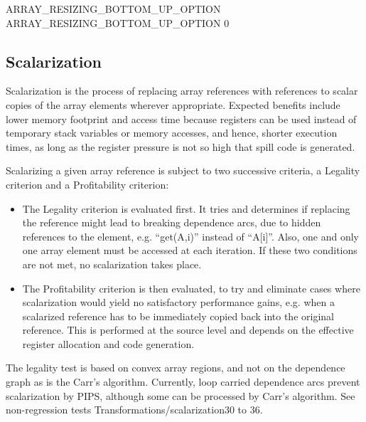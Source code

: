 \documentclass[a4paper]{report}
\newenvironment{PipsPass}[1]{\label{pass:#1}}{}
\begin{document}
\begin{PipsProp}{ARRAY_RESIZING_BOTTOM_UP_OPTION}
ARRAY_RESIZING_BOTTOM_UP_OPTION 0
\end{PipsProp}


\subsection{Scalarization}

\begin{PipsPass}{scalarization}
  Scalarization is the process of replacing array references with
  references to scalar copies of the array elements wherever
  appropriate. Expected benefits include lower memory footprint and
  access time because registers can be used instead of temporary stack
  variables or memory accesses, and hence, shorter execution times, as
  long as the register pressure is not so high that spill code is
  generated.
\end{PipsPass}

Scalarizing a given array reference is subject to two successive
criteria, a Legality criterion and a Profitability criterion:

\begin{itemize}
\item The Legality criterion is evaluated first. It tries and
  determines if replacing the reference might lead to breaking
  dependence arcs, due to hidden references to the element,
  e.g. ``get(A,i)'' instead of ``A[i]''. Also, one and only one array
  element must be accessed at each iteration. If these two conditions
  are not met, no scalarization takes place.

\item The Profitability criterion is then evaluated, to try and
  eliminate cases where scalarization would yield no satisfactory
  performance gains, e.g. when a scalarized reference has to be
  immediately copied back into the original reference. This is
  performed at the source level and depends on the effective register
  allocation and code generation.
\end{itemize}

The legality test is based on convex array regions, and not on the
dependence graph as is the Carr's algorithm. Currently, loop carried
dependence arcs prevent scalarization by PIPS, although some can be
processed by Carr's algorithm. See non-regression tests
Transformations/scalarization30 to 36.
\end{document}
